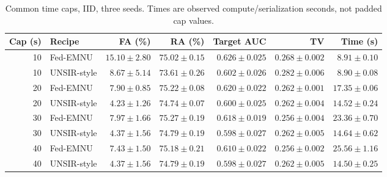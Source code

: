 \begin{table}[htbp]\centering\scriptsize\setlength{\tabcolsep}{4pt}
\caption{Common time caps, IID, three seeds. Times are observed compute/serialization seconds, not padded cap values.}\label{tab:walltime-iid}
\begin{tabular}{rlrrrrr}\toprule Cap (s) & Recipe & FA (\%) & RA (\%) & Target AUC & TV & Time (s)\\\midrule
10 & Fed-EMNU & $15.10 \pm 2.80$ & $75.02 \pm 0.15$ & $0.626 \pm 0.025$ & $0.268 \pm 0.002$ & $8.91 \pm 0.10$\\
10 & UNSIR-style & $8.67 \pm 5.14$ & $73.61 \pm 0.26$ & $0.602 \pm 0.026$ & $0.282 \pm 0.006$ & $8.90 \pm 0.08$\\
20 & Fed-EMNU & $7.90 \pm 0.85$ & $75.22 \pm 0.08$ & $0.620 \pm 0.022$ & $0.262 \pm 0.001$ & $17.35 \pm 0.06$\\
20 & UNSIR-style & $4.23 \pm 1.26$ & $74.74 \pm 0.07$ & $0.600 \pm 0.025$ & $0.262 \pm 0.004$ & $14.52 \pm 0.24$\\
30 & Fed-EMNU & $7.97 \pm 1.66$ & $75.27 \pm 0.19$ & $0.618 \pm 0.019$ & $0.256 \pm 0.004$ & $23.36 \pm 0.70$\\
30 & UNSIR-style & $4.37 \pm 1.56$ & $74.79 \pm 0.19$ & $0.598 \pm 0.027$ & $0.262 \pm 0.005$ & $14.64 \pm 0.62$\\
40 & Fed-EMNU & $7.43 \pm 1.50$ & $75.18 \pm 0.21$ & $0.610 \pm 0.022$ & $0.256 \pm 0.002$ & $25.56 \pm 1.16$\\
40 & UNSIR-style & $4.37 \pm 1.56$ & $74.79 \pm 0.19$ & $0.598 \pm 0.027$ & $0.262 \pm 0.005$ & $14.50 \pm 0.25$\\
\bottomrule\end{tabular}\end{table}

